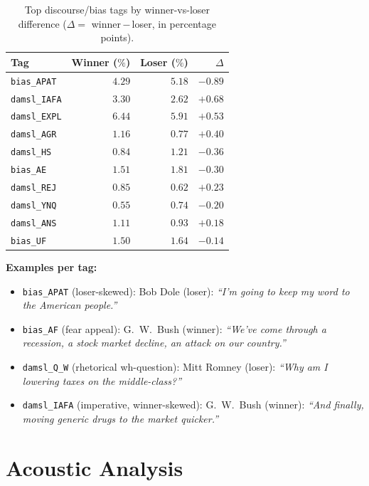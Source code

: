 \documentclass[journal]{IEEEtran}
\newcommand{\winner}{\textcolor[HTML]{1B5E20}}
\newcommand{\loser}{\textcolor[HTML]{B71C1C}}
\begin{document}
\begin{table}[t]
\caption{Top discourse/bias tags by winner-vs-loser difference
($\Delta = $ winner\,$-$\,loser, in percentage points).}
\label{tab:tagdelta}
\centering
\begin{tabular}{lrrr}
\toprule
Tag                  & Winner ($\%$) & Loser ($\%$) & $\Delta$ \\
\midrule
\texttt{bias\_APAT}  & $4.29$ & $5.18$ & $-0.89$ \\
\texttt{damsl\_IAFA} & $3.30$ & $2.62$ & $+0.68$ \\
\texttt{damsl\_EXPL} & $6.44$ & $5.91$ & $+0.53$ \\
\texttt{damsl\_AGR}  & $1.16$ & $0.77$ & $+0.40$ \\
\texttt{damsl\_HS}   & $0.84$ & $1.21$ & $-0.36$ \\
\texttt{bias\_AE}    & $1.51$ & $1.81$ & $-0.30$ \\
\texttt{damsl\_REJ}  & $0.85$ & $0.62$ & $+0.23$ \\
\texttt{damsl\_YNQ}  & $0.55$ & $0.74$ & $-0.20$ \\
\texttt{damsl\_ANS}  & $1.11$ & $0.93$ & $+0.18$ \\
\texttt{bias\_UF}    & $1.50$ & $1.64$ & $-0.14$ \\
\bottomrule
\end{tabular}
\end{table}

\noindent\textbf{Examples per tag:}
\begin{itemize}\itemsep0pt
\item \texttt{bias\_APAT} (loser-skewed): \loser{Bob Dole (loser):}
      \emph{``I'm going to keep my word to the American people.''}
\item \texttt{bias\_AF} (fear appeal): \winner{G.\ W.\ Bush (winner):}
      \emph{``We've come through a recession, a stock market decline,
      an attack on our country.''}
\item \texttt{damsl\_Q\_W} (rhetorical wh-question):
      \loser{Mitt Romney (loser):}
      \emph{``Why am I lowering taxes on the middle-class?''}
\item \texttt{damsl\_IAFA} (imperative, winner-skewed):
      \winner{G.\ W.\ Bush (winner):}
      \emph{``And finally, moving generic drugs to the market quicker.''}
\end{itemize}

\section{Acoustic Analysis}
\label{sec:acoustic}
\end{document}
